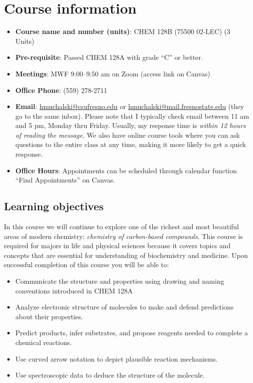 \hypertarget{course-information}{%
\section{Course information}\label{course-information}}

\begin{itemize}
\tightlist
\item
  \textbf{Course name and number (units)}: CHEM 128B (75500 02-LEC) (3
  Units)
\item
  \textbf{Pre-requisite}: Passed CHEM 128A with grade ``C'' or better.
\item
  \textbf{Meetings}: MWF 9:00--9:50 am on Zoom (access link on Canvas)
\item
  \textbf{Office Phone}: (559) 278-2711
\item
  \textbf{Email}: \url{hmuchalski@csufresno.edu} or
  \url{hmuchalski@mail.fresnostate.edu} (they go to the same inbox).
  Please note that I typically check email between 11 am and 5 pm,
  Monday thru Friday. Usually, my response time is \emph{within 12 hours
  of reading the message}. We also have online course tools where you
  can ask questions to the entire class at any time, making it more
  likely to get a quick response.
\item
  \textbf{Office Hours}: Appointments can be scheduled through calendar
  function ``Find Appointments'' on Canvas.
\end{itemize}

\hypertarget{learning-objectives}{%
\subsection{Learning objectives}\label{learning-objectives}}

In this course we will continue to explore one of the richest and most
beautiful areas of modern chemistry: \emph{chemistry of carbon-based
compounds}. This course is required for majors in life and physical
sciences because it covers topics and concepts that are essential for
understanding of biochemistry and medicine. Upon successful completion
of this course you will be able to:

\begin{itemize}
\tightlist
\item
  Communicate the structure and properties using drawing and naming
  conventions introduced in CHEM 128A
\item
  Analyze electronic structure of molecules to make and defend
  predictions about their properties.
\item
  Predict products, infer substrates, and propose reagents needed to
  complete a chemical reactions.
\item
  Use curved arrow notation to depict plausible reaction mechanisms.
\item
  Use spectroscopic data to deduce the structure of the molecule.
\end{itemize}

